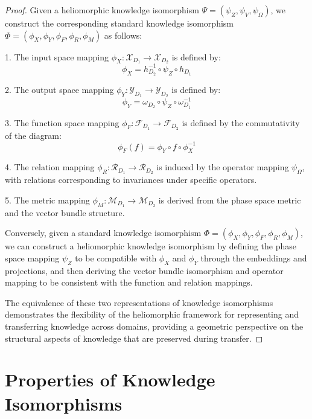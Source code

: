 \begin{proof}
Given a heliomorphic knowledge isomorphism $\Psi = (\psi_Z, \psi_V, \psi_{\Omega})$, we construct the corresponding standard knowledge isomorphism $\Phi = (\phi_X, \phi_Y, \phi_F, \phi_R, \phi_M)$ as follows:

1. The input space mapping $\phi_X: \mathcal{X}_{D_1} \to \mathcal{X}_{D_2}$ is defined by:
   \begin{equation}
   \phi_X = h_{D_2}^{-1} \circ \psi_Z \circ h_{D_1}
   \end{equation}
   
2. The output space mapping $\phi_Y: \mathcal{Y}_{D_1} \to \mathcal{Y}_{D_2}$ is defined by:
   \begin{equation}
   \phi_Y = \omega_{D_2} \circ \psi_Z \circ \omega_{D_1}^{-1}
   \end{equation}
   
3. The function space mapping $\phi_F: \mathcal{F}_{D_1} \to \mathcal{F}_{D_2}$ is defined by the commutativity of the diagram:
   \begin{equation}
   \phi_F(f) = \phi_Y \circ f \circ \phi_X^{-1}
   \end{equation}
   
4. The relation mapping $\phi_R: \mathcal{R}_{D_1} \to \mathcal{R}_{D_2}$ is induced by the operator mapping $\psi_{\Omega}$, with relations corresponding to invariances under specific operators.
   
5. The metric mapping $\phi_M: \mathcal{M}_{D_1} \to \mathcal{M}_{D_2}$ is derived from the phase space metric and the vector bundle structure.

Conversely, given a standard knowledge isomorphism $\Phi = (\phi_X, \phi_Y, \phi_F, \phi_R, \phi_M)$, we can construct a heliomorphic knowledge isomorphism by defining the phase space mapping $\psi_Z$ to be compatible with $\phi_X$ and $\phi_Y$ through the embeddings and projections, and then deriving the vector bundle isomorphism and operator mapping to be consistent with the function and relation mappings.

The equivalence of these two representations of knowledge isomorphisms demonstrates the flexibility of the heliomorphic framework for representing and transferring knowledge across domains, providing a geometric perspective on the structural aspects of knowledge that are preserved during transfer.
\end{proof}

\section{Properties of Knowledge Isomorphisms}

